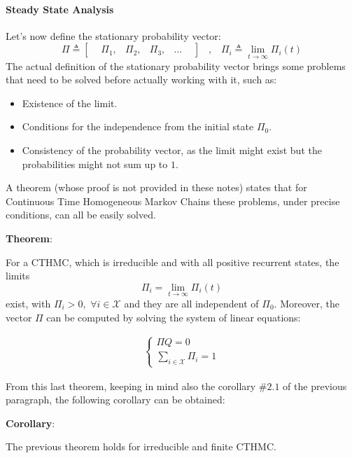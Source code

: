 \documentclass[12pt,a4paper]{article}
\begin{document}
\paragraph{Steady State Analysis}
Let's now define the stationary probability vector:
$$
\Pi\triangleq \left[
\begin{matrix}
&\Pi_1,& \Pi_2,& \Pi_3,& \dots&
\end{matrix}
\right]
\hspace{10pt},\hspace{10pt}
\Pi_i\triangleq
\lim_{t\rightarrow\infty}{\Pi_i(t)}
$$ 
The actual definition of the stationary probability vector brings some problems that need to be solved before actually working with it, such as:
\begin{itemize}
\item Existence of the limit.
\item Conditions for the independence from the initial state $\Pi_0$.
\item Consistency of the probability vector, as the limit might exist but the probabilities might not sum up to $1$. 
\end{itemize}
A theorem (whose proof is not provided in these notes) states that for Continuous Time Homogeneous Markov Chains these problems, under precise conditions, can all be easily solved.

\bigskip
\noindent
\textbf{Theorem}: 

\noindent
For a CTHMC, which is irreducible and with all positive recurrent states, the limits
$$
\Pi_i=
\lim_{t\rightarrow\infty}{\Pi_i(t)}
$$
exist, with $\Pi_i>0,\hspace{4pt}\forall i\in\mathcal{X}$ and they are all independent of $\Pi_0$. Moreover, the vector $\Pi$ can be computed by solving the system of linear equations:

\begin{Large}
$$
\begin{matrix}
\begin{cases}
\Pi Q=0\\
\underset{i\in\mathcal{X}}{\sum{}}{\Pi_i=1}
\end{cases}
\end{matrix}
$$
\end{Large}
\newpage
\noindent
From this last theorem, keeping in mind also the corollary $\#2.1$ of the previous paragraph, the following corollary can be obtained:

\bigskip
\noindent
\textbf{Corollary}: 

\noindent
The previous theorem holds for irreducible and finite CTHMC.
\end{document}
